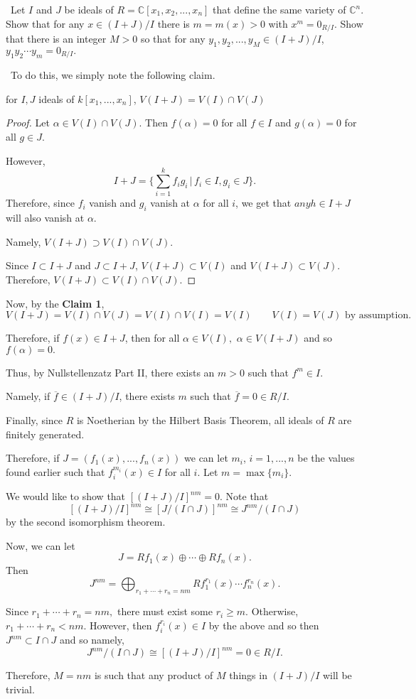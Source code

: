 \documentclass[12pt]{AlgebraQual}
\begin{document}
\begin{problem} $\,$
Let $I$ and $J$ be ideals of $R=\mathbb{C}[x_1,x_2,...,x_n]$ that define the same variety of $\mathbb{C}^n$. Show that for any $x\in (I+J)/I$ there is $m=m(x)>0$ with $x^m=0_{R/I}$. Show that there is an integer $M>0$ so that for any $y_1,y_2,...,y_M\in (I+J)/I$, $y_1y_2\cdots y_m=0_{R/I}.$
\end{problem}


\begin{solution}$\,$
To do this, we simply note the following claim.

\begin{claim} for $I,J$ ideals of $k[x_1,...,x_n]$, $V(I+J)=V(I)\cap V(J)$
\begin{proof} \boxed{\supset} Let $\alpha\in V(I)\cap V(J)$. Then $f(\alpha)=0$ for all $f\in I$ and $g(\alpha)=0$ for all $g\in J$.

However, $$I+J=\{\sum_{i=1}^kf_ig_i\,|\,f_i\in I,g_i\in J\}.$$ Therefore, since $f_i$ vanish and $g_i$ vanish at $\alpha$ for all $i$, we get that $any h\in I+J$ will also vanish at $\alpha.$

Namely, $V(I+J)\supset V(I)\cap V(J).$

\boxed{\subset} Since $I\subset I+J$ and $J\subset I+J$, $V(I+J)\subset V(I)$ and $V(I+J)\subset V(J)$. Therefore, $V(I+J)\subset V(I)\cap V(J).$
\end{proof}
\end{claim}

Now, by the \textbf{Claim 1}, $$V(I+J)=V(I)\cap V(J)=V(I)\cap V(I)=V(I)\qquad V(I)=V(J)\text{ by assumption.}$$

Therefore, if $f(x)\in I+J$, then for all $\alpha\in V(I),$ $\alpha\in V(I+J)$ and so $f(\alpha)=0.$

Thus, by Nullstellenzatz Part II, there exists an $m>0$ such that $f^m\in I$.

Namely, if $\overline{f}\in (I+J)/I$, there exists $m$ such that $\overline{f}=0\in R/I$.

Finally, since $R$ is Noetherian by the Hilbert Basis Theorem, all ideals of $R$ are finitely generated.

Therefore, if $J=(f_1(x),...,f_n(x))$ we can let $m_i$, $i=1,...,n$ be the values found earlier such that $f_i^{m_i}(x)\in I$ for all $i$. Let $m=\max\{m_i\}$.

We would like to show that $[(I+J)/I]^{nm}=0$. Note that $$[(I+J)/I]^{nm}\cong[J/(I\cap J)]^{nm}\cong J^{nm}/(I\cap J)$$ by the second isomorphism theorem.

Now, we can let $$J=Rf_1(x)\oplus\cdots\oplus Rf_n(x).$$ Then $$J^{nm}=\bigoplus_{r_1+\cdots+r_n=nm}Rf_1^{r_1}(x)\cdots f_n^{r_n}(x).$$

Since $r_1+\cdots+r_n=nm,$ there must exist some $r_i\ge m$. Otherwise, $r_1+\cdots+r_n<nm.$ However, then $f_i^{r_i}(x)\in I$ by the above and so then $J^{nm}\subset I\cap J$ and so namely, $$J^{nm}/(I\cap J)\cong [(I+J)/I]^{nm}=0\in R/I.$$

Therefore, $M=nm$ is such that any product of $M$ things in $(I+J)/I$ will be trivial.
\end{solution}
\newpage
\end{document}
